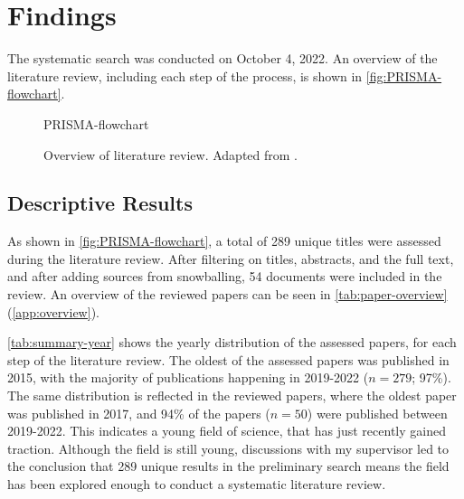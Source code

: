 \section{Findings}
\label{sec:Results}
The systematic search was conducted on October 4, 2022. An overview of the literature review, including each step of the process, is shown in \autoref{fig:PRISMA-flowchart}.


\begin{figure}[p]
    \centering
    {PRISMA-flowchart}
    \caption[Overview of literature review]{Overview of literature review. Adapted from \textcite{PRISMA_2022}.}
    \label{fig:PRISMA-flowchart}
\end{figure}


\subsection{Descriptive Results} %
As shown in \autoref{fig:PRISMA-flowchart}, a total of 289 unique titles were assessed during the literature review. After filtering on titles, abstracts, and the full text, and after adding sources from snowballing, 54 documents were included in the review. An overview of the reviewed papers can be seen in \autoref{tab:paper-overview} (\autoref{app:overview}).

\autoref{tab:summary-year} shows the yearly distribution of the assessed papers, for each step of the literature review. The oldest of the assessed papers was published in 2015, with the majority of publications happening in 2019-2022 ($n = 279$; 97\%). The same distribution is reflected in the reviewed papers, where the oldest paper was published in 2017, and 94\% of the papers ($n = 50$) were published between 2019-2022. This indicates a young field of science, that has just recently gained traction. Although the field is still young, discussions with my supervisor led to the conclusion that 289 unique results in the preliminary search means the field has been explored enough to conduct a systematic literature review.

